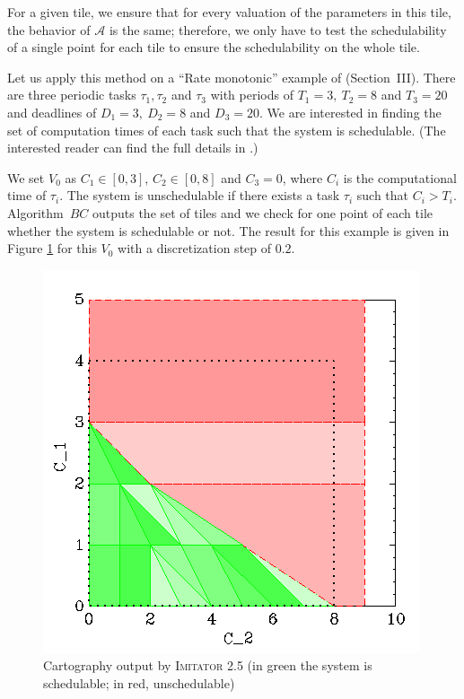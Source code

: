 \documentclass{llncs}
\newcommand{\A}{\mathcal{A}}
\newcommand{\IM}{\mathit{IM}}
\newcommand{\BC}{\mathit{BC}}
\newcommand{\imitator}{\textsc{Imitator}}
\begin{document}
For a given tile, we ensure that for every valuation of the parameters in this tile, the behavior of $\A$ is the same;
therefore, we only have to test the schedulability of a single point for each tile to ensure the schedulability on the whole tile.

Let us apply this method on a ``Rate monotonic'' example of \cite{bb04} (Section~III).
There are three periodic tasks $\tau_1, \tau_2$ and $\tau_3$ with periods of $T_1 = 3, \ T_2 = 8$ and $T_3 = 20$ and deadlines of $D_1 = 3, \ D_2 = 8$ and $D_3 = 20$.
We are interested in finding the set of computation times of each task such that the system is schedulable.
(The interested reader can find the full details in \cite{bb04}.)

We set $V_0$ as $C_1 \in [0,3]$, $C_2 \in [0,8]$ and $C_3 = 0$, where $C_i$ is the computational time of $\tau_i$. The system is unschedulable if there exists a task $\tau_i$ such that $C_i > T_i$. 
Algorithm~$\BC$ outputs the set of tiles and we check for one point of each tile whether the system is schedulable or not.
The result for this example is given in Figure \ref{fig:carto} for this $V_0$ with a discretization step of $0.2$.

\begin{figure}[!ht]
	\centering
	\includegraphics[scale = 0.5]{./figures/C1-C2.png}
	\caption{Cartography output by \imitator{} 2.5 (in green the system is schedulable; in red, unschedulable)}
	\label{fig:carto}
\end{figure}
\end{document}
